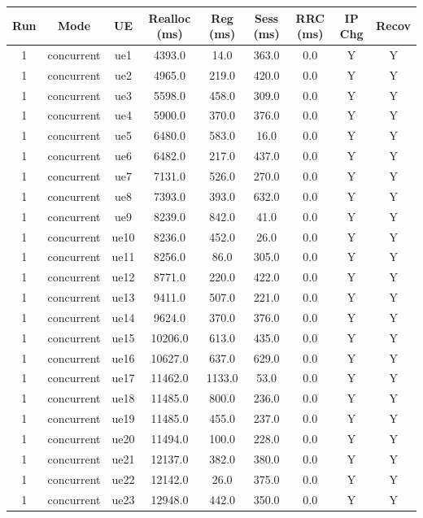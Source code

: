 \begin{table}[ht]
\centering
\begin{tabular}{|c|c|c|c|c|c|c|c|c|}
\hline
Run & Mode & UE & Realloc (ms) & Reg (ms) & Sess (ms) & RRC (ms) & IP Chg & Recov \\
\hline
1 & concurrent & ue1 & 4393.0 & 14.0 & 363.0 & 0.0 & Y & Y \\
1 & concurrent & ue2 & 4965.0 & 219.0 & 420.0 & 0.0 & Y & Y \\
1 & concurrent & ue3 & 5598.0 & 458.0 & 309.0 & 0.0 & Y & Y \\
1 & concurrent & ue4 & 5900.0 & 370.0 & 376.0 & 0.0 & Y & Y \\
1 & concurrent & ue5 & 6480.0 & 583.0 & 16.0 & 0.0 & Y & Y \\
1 & concurrent & ue6 & 6482.0 & 217.0 & 437.0 & 0.0 & Y & Y \\
1 & concurrent & ue7 & 7131.0 & 526.0 & 270.0 & 0.0 & Y & Y \\
1 & concurrent & ue8 & 7393.0 & 393.0 & 632.0 & 0.0 & Y & Y \\
1 & concurrent & ue9 & 8239.0 & 842.0 & 41.0 & 0.0 & Y & Y \\
1 & concurrent & ue10 & 8236.0 & 452.0 & 26.0 & 0.0 & Y & Y \\
1 & concurrent & ue11 & 8256.0 & 86.0 & 305.0 & 0.0 & Y & Y \\
1 & concurrent & ue12 & 8771.0 & 220.0 & 422.0 & 0.0 & Y & Y \\
1 & concurrent & ue13 & 9411.0 & 507.0 & 221.0 & 0.0 & Y & Y \\
1 & concurrent & ue14 & 9624.0 & 370.0 & 376.0 & 0.0 & Y & Y \\
1 & concurrent & ue15 & 10206.0 & 613.0 & 435.0 & 0.0 & Y & Y \\
1 & concurrent & ue16 & 10627.0 & 637.0 & 629.0 & 0.0 & Y & Y \\
1 & concurrent & ue17 & 11462.0 & 1133.0 & 53.0 & 0.0 & Y & Y \\
1 & concurrent & ue18 & 11485.0 & 800.0 & 236.0 & 0.0 & Y & Y \\
1 & concurrent & ue19 & 11485.0 & 455.0 & 237.0 & 0.0 & Y & Y \\
1 & concurrent & ue20 & 11494.0 & 100.0 & 228.0 & 0.0 & Y & Y \\
1 & concurrent & ue21 & 12137.0 & 382.0 & 380.0 & 0.0 & Y & Y \\
1 & concurrent & ue22 & 12142.0 & 26.0 & 375.0 & 0.0 & Y & Y \\
1 & concurrent & ue23 & 12948.0 & 442.0 & 350.0 & 0.0 & Y & Y \\

\end{tabular}
\end{table}

